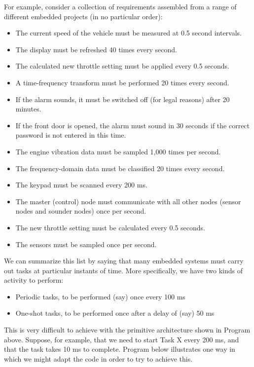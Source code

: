 \documentclass[twoside, final]{hcmut_report}
\begin{document}
For example, consider a collection of requirements assembled from a range of different embedded projects (in no particular order):
\begin{itemize}
    \item The current speed of the vehicle must be measured at 0.5 second intervals.
    \item The display must be refreshed 40 times every second. 
    \item The calculated new throttle setting must be applied every 0.5 seconds.
    \item A time-frequency transform must be performed 20 times every second.
    \item If the alarm sounds, it must be switched off (for legal reasons) after 20 minutes.
    \item If the front door is opened, the alarm must sound in 30 seconds if the correct
password is not entered in this time.    
\item The engine vibration data must be sampled 1,000 times per second.
    \item The frequency-domain data must be classified 20 times every second.
    \item The keypad must be scanned every 200 ms.
    \item The master (control) node must communicate with all other nodes (sensor nodes
and sounder nodes) once per second.
    \item The new throttle setting must be calculated every 0.5 seconds. 
    \item The sensors must be sampled once per second.
\end{itemize}

We can summarize this list by saying that many embedded systems must carry
out tasks at particular instants of time. More specifically, we have two kinds of activity to perform:
\begin{itemize}
    \item Periodic tasks, to be performed (say) once every 100 ms
    \item One-shot tasks, to be performed once after a delay of (say) 50 ms  
\end{itemize}

This is very difficult to achieve with the primitive architecture shown in Program above. Suppose, for example, that we need to start Task X every 200 ms, and that the
task takes 10 ms to complete. Program below illustrates one way in which we might
adapt the code in order to try to achieve this.
\end{document}
